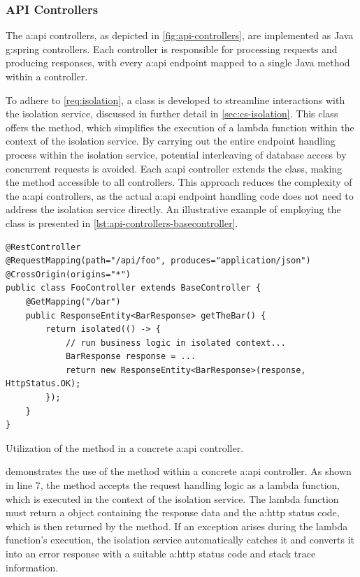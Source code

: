 \subsubsection{API Controllers}\label{sec:cs-api-controllers}

The \gls{a:api} controllers, as depicted in \cref{fig:api-controllers}, are implemented as Java \gls{g:spring} controllers. Each controller is responsible for processing requests and producing responses, with every \gls{a:api} endpoint mapped to a single Java method within a controller.

To adhere to \cref{req:isolation}, a  class is developed to streamline interactions with the isolation service, discussed in further detail in \vref{sec:cs-isolation}. This class offers the  method, which simplifies the execution of a lambda function within the context of the isolation service. By carrying out the entire endpoint handling process within the isolation service, potential interleaving of database access by concurrent requests is avoided. Each \gls{a:api} controller extends the  class, making the  method accessible to all controllers. This approach reduces the complexity of the \gls{a:api} controllers, as the actual \gls{a:api} endpoint handling code does not need to address the isolation service directly. An illustrative example of employing the  class is presented in \cref{lst:api-controllers-basecontroller}.

\begin{listing}[H]
\begin{verbatim}
@RestController
@RequestMapping(path="/api/foo", produces="application/json")
@CrossOrigin(origins="*")
public class FooController extends BaseController {
    @GetMapping("/bar")
    public ResponseEntity<BarResponse> getTheBar() {
        return isolated(() -> {
            // run business logic in isolated context...
            BarResponse response = ...
            return new ResponseEntity<BarResponse>(response, HttpStatus.OK);
        });
    }
}
\end{verbatim}
\caption{Utilization of the  method in a concrete \gls{a:api} controller.}
\label{lst:api-controllers-basecontroller}
\end{listing}

 demonstrates the use of the  method within a concrete \gls{a:api} controller. As shown in line 7, the  method accepts the request handling logic as a lambda function, which is executed in the context of the isolation service. The lambda function must return a  object containing the response data and the \gls{a:http} status code, which is then returned by the  method. If an exception arises during the lambda function's execution, the isolation service automatically catches it and converts it into an error response with a suitable \gls{a:http} status code and stack trace information.

